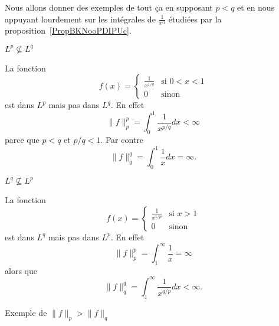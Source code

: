 Nous allons donner des exemples de tout ça en supposant \( p<q\) et en nous appuyant lourdement sur les intégrales de \( \frac{1}{ x^{\alpha} }\) étudiées par la proposition~\ref{PropBKNooPDIPUc}.

\begin{subproof}
    \item[\( L^p\nsubseteq L^q\)]

        La fonction
        \begin{equation}    \label{EqXIEooZpxObV}
            f(x)=\begin{cases}
                \frac{1}{ x^{1/q} }    &   \text{si } 0<x<1\\
                0    &    \text{sinon}
            \end{cases}
        \end{equation}
        est dans \( L^p\) mais pas dans \( L^q\). En effet
        \begin{equation}
            \| f \|_p^p=\int_0^1\frac{1}{ x^{p/q} }dx<\infty
        \end{equation}
        parce que \( p<q\) et \( p/q<1\). Par contre
        \begin{equation}
            \| f \|_q^q=\int_0^1\frac{1}{ x }dx=\infty.
        \end{equation}

    \item[\( L^q\nsubseteq L^p\)]

        La fonction
        \begin{equation}
            f(x)=\begin{cases}
                \frac{1}{ x^{1/p} }    &   \text{si } x>1\\
                0    &    \text{sinon}
            \end{cases}
        \end{equation}
        est dans \( L^q\) mais pas dans \( L^p\). En effet
        \begin{equation}
            \| f \|_p^p=\int_1^{\infty}\frac{1}{ x }=\infty
        \end{equation}
        alors que
        \begin{equation}
            \| f \|_q^q=\int_1^{\infty}\frac{1}{ x^{q/p} }dx<\infty.
        \end{equation}

    \item[Exemple de \( \| f \|_p>\| f \|_q\)]


\end{subproof}
